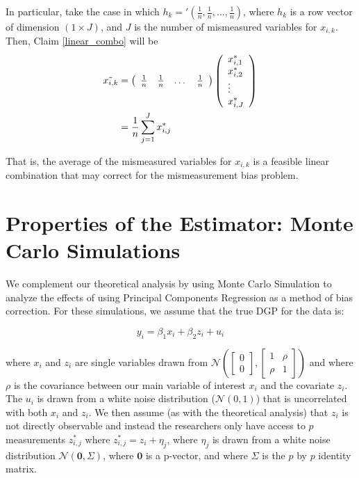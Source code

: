 \documentclass[10pt]{article}
\begin{document}
        In particular, take the case in which $h_k='(\frac{1}{n},\frac{1}{n},\dots,\frac{1}{n})$, where $h_k$ is a row vector of dimension $(1\times J)$, and $J$ is the number of mismeasured variables for $x_{i,k}$. Then, Claim \ref{linear_combo} will be
        \begin{align}
            \Tilde{x_{i,k}}&=\left(\begin{array}{cccc}
            \frac{1}{n} & \frac{1}{n} & \dots &\frac{1}{n} 
            \end{array}\right)\left(\begin{array}{l}
            x^*_{i,1} \\
            x^*_{i,2} \\
            \vdots \\
            x^*_{i,J} 
            \end{array}\right)\\
            &=\frac{1}{n}\sum_{j=1}^J x^*_{i,j}
        \end{align}
        
        That is, the average of the mismeasured variables for $x_{i,k}$ is a feasible linear combination that may correct for the mismeasurement bias problem.

    \section*{Properties of the Estimator: Monte Carlo Simulations}

        We complement our theoretical analysis by using Monte Carlo Simulation to analyze the effects of using Principal Components Regression as a method of bias correction. For these simulations, we assume that the true DGP for the data is:

        $$y_i = \beta_1 x_i + \beta_2 z_i + u_i$$

        where $x_i$ and $z_i$ are single variables drawn from $\mathcal{N}(\begin{bmatrix} 0\\ 0 \end{bmatrix}, \begin{bmatrix} 1 & \rho\\ \rho & 1\end{bmatrix})$ and where $\rho$ is the covariance between our main variable of interest $x_i$ and the covariate $z_i$. The $u_i$ is drawn from a white noise distribution ($\mathcal{N}(0,1)$) that is uncorrelated with both $x_i$ and $z_i$. We then assume (as with the theoretical analysis) that $z_i$ is not directly observable and instead the researchers only have access to $p$ measurements $z_{i,j}^*$ where $z_{i,j}^* = z_i + \eta_j$, where $\eta_j$ is drawn from a white noise distribution $\mathcal{N}(\mathbf{0},\Sigma)$, where $\mathbf{0}$ is a p-vector, and where $\Sigma$ is the $p$ by $p$ identity matrix.
\end{document}
